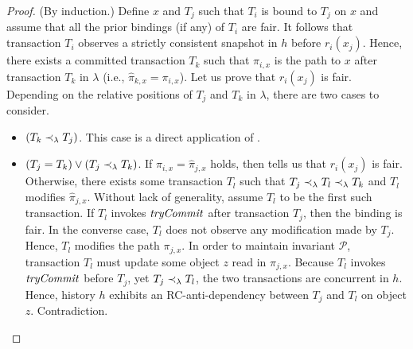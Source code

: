 \begin{proof}

  (By induction.)
  Define $x$ and $T_j$ such that $T_i$ is bound to $T_j$ on $x$ and assume that all the prior bindings (if any) of $T_i$ are fair.
  It follows that transaction $T_i$ observes a strictly consistent snapshot in $h$ before $r_i(x_j)$.
  Hence, there exists a committed transaction $T_k$ such that $\pi_{i,x}$ is the path to $x$ after transaction $T_k$ in $\lambda$ (i.e., $\hat{\pi}_{k,x}= \pi_{i,x}$).
  Let us prove that $r_i(x_j)$ is fair.
  Depending on the relative positions of $T_j$ and $T_k$ in $\lambda$, there are two cases to consider.
  \begin{itemize}
  \item $(T_k \hb_{\lambda} T_j)$.
    This case is a direct application of .
  \item $(T_j = T_k) \lor (T_j \hb_{\lambda} T_k)$.
    If $\pi_{i,x} = \hat{\pi}_{j,x}$ holds, then  tells us that $r_i(x_j)$ is fair.
    Otherwise, there exists some transaction $T_l$ such that $T_j \hb_{\lambda} T_l \hb_{\lambda} T_k$ and $T_l$ modifies $\hat{\pi}_{j,x}$.
    Without lack of generality, assume $T_l$ to be the first such transaction.
    If $T_l$ invokes $\stmTryCommitFunction$ after transaction $T_j$, then the binding is fair.
    In the converse case, $T_l$ does not observe any modification made by $T_j$.
    Hence, $T_l$ modifies the path $\pi_{j,x}$.
    In order to maintain invariant $\mathcal{P}$, transaction $T_l$ must update some object $z$ read in $\pi_{j,x}$.
    Because $T_l$ invokes $\stmTryCommitFunction$ before $T_j$, yet $T_j \hb_{\lambda} T_l$, the two transactions are concurrent in $h$.
    Hence, history $h$ exhibits an RC-anti-dependency between $T_j$ and $T_l$ on object $z$.
    Contradiction.
  \end{itemize}
\end{proof}
